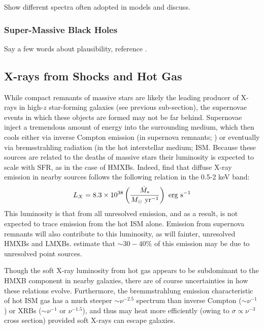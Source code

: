 {\color{red} Show different spectra often adopted in models and discuss.}


\subsubsection{Super-Massive Black Holes}
{\color{red} Say a few words about plausibility, reference \cite{Tanaka2016}.}



\subsection{X-rays from Shocks and Hot Gas}
While compact remnants of massive stars are likely the leading producer of X-rays in high-$z$ star-forming galaxies (see previous sub-section), the supernovae events in which these objects are formed may not be far behind. Supernovae inject a tremendous amount of energy into the surrounding medium, which then cools either via inverse Compton emission (in supernova remnants; \cite{Oh2001}) or eventually via bremsstrahling radiation (in the hot interstellar medium; ISM. Because these sources are related to the deaths of massive stars their luminosity is expected to scale with SFR, as in the case of HMXBs. Indeed, \cite{Mineo2012b} find that diffuse X-ray emission in nearby sources follows the following relation in the 0.5-2 keV band:
\begin{equation}
	L_X = 8.3 \times 10^{38} \left(\frac{\SFR}{M_{\odot} \ \mathrm{yr}^{-1}} \right) \ \mathrm{erg} \ \mathrm{s}^{-1} \label{eq:LxSFRII_Mineo}
\end{equation}
This luminosity is that from all unresolved emission, and as a result, is not expected to trace emission from the hot ISM alone. Emission from supernova remnants will also contribute to this luminosity, as will fainter, unresolved HMXBs and LMXBs. \cite{Mineo2012b} estimate that $\sim 30-40$\% of this emission may be due to unresolved point sources. 

Though the soft X-ray luminosity from hot gas appears to be subdominant to the HMXB component in nearby galaxies, there are of course uncertainties in how these relations evolve. Furthermore, the bremmstrahlung emission characteristic of hot ISM gas has a much steeper $\sim \nu^{-2.5}$ spectrum than inverse Compton ($\sim \nu^{-1}$) or XRBs ($\sim \nu^{-1}$ or $\nu^{-1.5}$), and thus may heat more efficiently (owing to $\sigma \propto \nu^{-3}$ cross section) provided soft X-rays can escape galaxies. 

